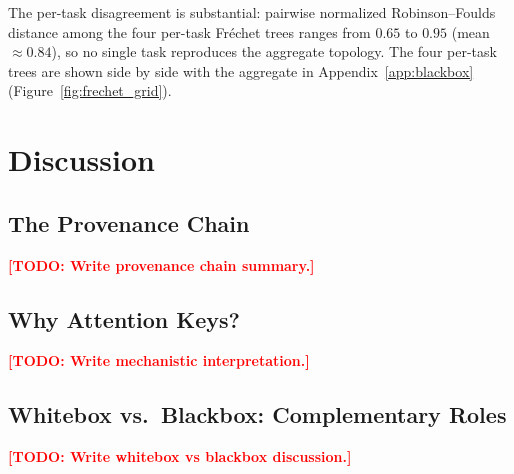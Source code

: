 \documentclass{article}
\theoremstyle{definition}
\theoremstyle{plain}
\newcommand{\TODO}[1]{\textcolor{red}{\textbf{[TODO: #1]}}}
\begin{document}
The per-task disagreement is substantial: pairwise normalized Robinson--Foulds distance among the
four per-task Fr\'echet trees ranges from $0.65$ to $0.95$ (mean $\approx 0.84$), so no single task
reproduces the aggregate topology. The four per-task trees are shown side by side with the aggregate
in Appendix~\ref{app:blackbox} (Figure~\ref{fig:frechet_grid}).


\section{Discussion}
\label{sec:discussion}

\subsection{The Provenance Chain}
\label{sec:discussion:chain}

\TODO{Write provenance chain summary.}

\subsection{Why Attention Keys?}
\label{sec:discussion:keys}

\TODO{Write mechanistic interpretation.}

\subsection{Whitebox vs.\ Blackbox: Complementary Roles}
\label{sec:discussion:wb_bb}

\TODO{Write whitebox vs blackbox discussion.}
\end{document}
